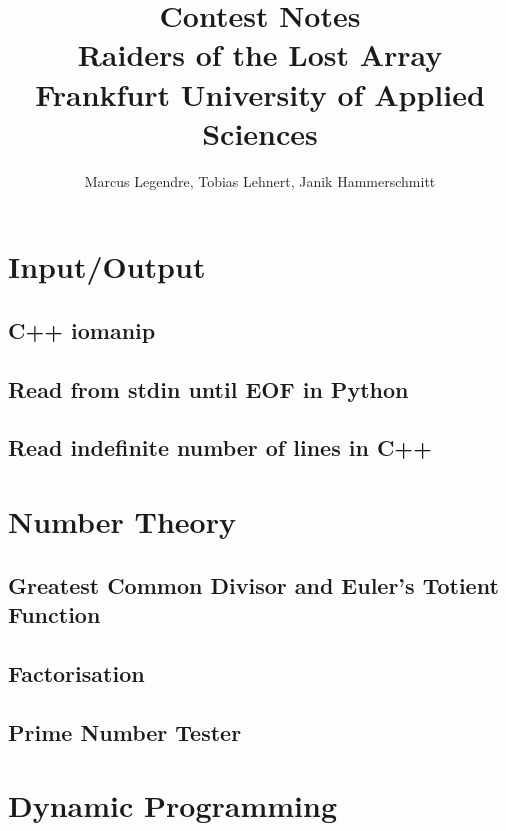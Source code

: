 \documentclass[11pt]{article}
\title{Contest Notes\\Raiders of the Lost Array\\Frankfurt University of Applied Sciences}
\author{Marcus Legendre, Tobias Lehnert, Janik Hammerschmitt}
\date{}
\begin{document}
\maketitle

\tableofcontents


\section{Input/Output}

\subsection{C++ iomanip}


\subsection{Read from stdin until EOF in Python}


\subsection{Read indefinite number of lines in C++}



\section{Number Theory}

\subsection{Greatest Common Divisor and Euler's Totient Function}


\subsection{Factorisation}


\subsection{Prime Number Tester}



\section{Dynamic Programming}
\end{document}
